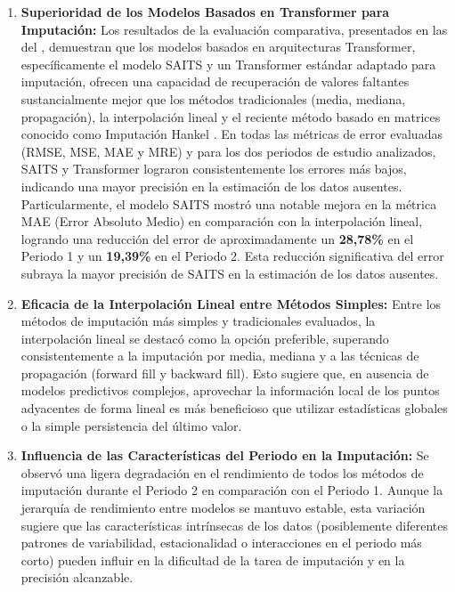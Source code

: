 \begin{enumerate}
    \item \textbf{Superioridad de los Modelos Basados en Transformer para Imputación:}
    Los resultados de la evaluación comparativa, presentados en las  del , demuestran que los modelos basados en arquitecturas Transformer, específicamente el modelo SAITS \citep{Du2023SAITS} y un Transformer estándar adaptado para imputación, ofrecen una capacidad de recuperación de valores faltantes sustancialmente mejor que los métodos tradicionales (media, mediana, propagación), la interpolación lineal y el reciente método basado en matrices conocido como Imputación Hankel \citep{PoudevigneJones24Hankel}. En todas las métricas de error evaluadas (RMSE, MSE, MAE y MRE) y para los dos periodos de estudio analizados, SAITS y Transformer lograron consistentemente los errores más bajos, indicando una mayor precisión en la estimación de los datos ausentes. Particularmente, el modelo SAITS mostró una notable mejora en la métrica MAE (Error Absoluto Medio) en comparación con la interpolación lineal, logrando una reducción del error de aproximadamente un \textbf{28,78\%} en el Periodo 1 y un \textbf{19,39\%} en el Periodo 2. Esta reducción significativa del error subraya la mayor precisión de SAITS en la estimación de los datos ausentes.

    \item \textbf{Eficacia de la Interpolación Lineal entre Métodos Simples:}
    Entre los métodos de imputación más simples y tradicionales evaluados, la interpolación lineal se destacó como la opción preferible, superando consistentemente a la imputación por media, mediana y a las técnicas de propagación (forward fill y backward fill). Esto sugiere que, en ausencia de modelos predictivos complejos, aprovechar la información local de los puntos adyacentes de forma lineal es más beneficioso que utilizar estadísticas globales o la simple persistencia del último valor.

    \item \textbf{Influencia de las Características del Periodo en la Imputación:}
    Se observó una ligera degradación en el rendimiento de todos los métodos de imputación durante el Periodo 2 en comparación con el Periodo 1. Aunque la jerarquía de rendimiento entre modelos se mantuvo estable, esta variación sugiere que las características intrínsecas de los datos (posiblemente diferentes patrones de variabilidad, estacionalidad o interacciones en el periodo más corto) pueden influir en la dificultad de la tarea de imputación y en la precisión alcanzable.


\end{enumerate}
